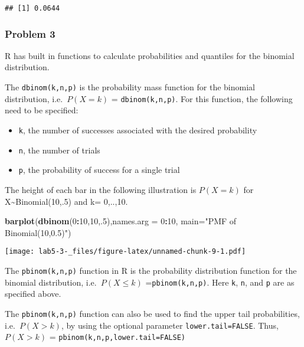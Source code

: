\documentclass[]{article}
\newenvironment{Shaded}{\begin{snugshade}}{\end{snugshade}}
\newcommand{\DataTypeTok}[1]{\textcolor[rgb]{0.13,0.29,0.53}{#1}}
\newcommand{\DecValTok}[1]{\textcolor[rgb]{0.00,0.00,0.81}{#1}}
\newcommand{\KeywordTok}[1]{\textcolor[rgb]{0.13,0.29,0.53}{\textbf{#1}}}
\newcommand{\NormalTok}[1]{#1}
\newcommand{\OperatorTok}[1]{\textcolor[rgb]{0.81,0.36,0.00}{\textbf{#1}}}
\newcommand{\StringTok}[1]{\textcolor[rgb]{0.31,0.60,0.02}{#1}}
\begin{document}
\begin{verbatim}
## [1] 0.0644
\end{verbatim}

\hypertarget{problem-3}{%
\subsubsection{Problem 3}\label{problem-3}}

R has built in functions to calculate probabilities and quantiles for
the binomial distribution.

The \texttt{dbinom(k,n,p)} is the probability mass function for the
binomial distribution, i.e.~\(P(X=k)\) = \texttt{dbinom(k,n,p)}. For
this function, the following need to be specified:

\begin{itemize}
\item
  \texttt{k}, the number of successes associated with the desired
  probability
\item
  \texttt{n}, the number of trials
\item
  \texttt{p}, the probability of success for a single trial
\end{itemize}

The height of each bar in the following illustration is \(P(X=k)\) for
X\textasciitilde Binomial(10,.5) and k= 0,..,10.

\begin{Shaded}
\begin{Highlighting}[]
\KeywordTok{barplot}\NormalTok{(}\KeywordTok{dbinom}\NormalTok{(}\DecValTok{0}\OperatorTok{:}\DecValTok{10}\NormalTok{,}\DecValTok{10}\NormalTok{,.}\DecValTok{5}\NormalTok{),}\DataTypeTok{names.arg =} \DecValTok{0}\OperatorTok{:}\DecValTok{10}\NormalTok{, }\DataTypeTok{main=}\StringTok{"PMF of Binomial(10,0.5)"}\NormalTok{)}
\end{Highlighting}
\end{Shaded}

\texttt{[image: lab5-3-\_files/figure-latex/unnamed-chunk-9-1.pdf]}

The \texttt{pbinom(k,n,p)} function in R is the probability distribution
function for the binomial distribution, i.e.~\(P(X \le k)\)
=\texttt{pbinom(k,n,p)}. Here \texttt{k}, \texttt{n}, and \texttt{p} are
as specified above.

The \texttt{pbinom(k,n,p)} function can also be used to find the upper
tail probabilities, i.e.~\(P(X>k)\), by using the optional parameter
\texttt{lower.tail=FALSE}. Thus, \(P(X>k)\) =
\texttt{pbinom(k,n,p,lower.tail=FALSE)}
\end{document}
